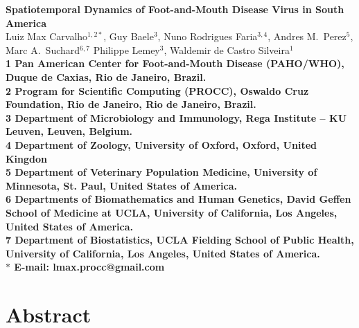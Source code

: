 \documentclass[10pt]{article}
\date{}
\begin{document}
\begin{flushleft}
{\Large
\textbf{Spatiotemporal Dynamics of Foot-and-Mouth Disease Virus in South America}
}
\\
Luiz Max Carvalho$^{1,2\ast}$,
Guy Baele$^{3}$,
Nuno Rodrigues Faria$^{3,4}$,
Andres M.~Perez$^{5}$,
Marc A.~Suchard$^{6,7}$
Philippe Lemey$^{3}$,
Waldemir de Castro Silveira$^{1}$
\\
\bf{1} Pan American Center for Foot-and-Mouth Disease (PAHO/WHO), Duque de Caxias, Rio de Janeiro, Brazil.
\\
\bf{2} Program for Scientific Computing (PROCC), Oswaldo Cruz Foundation, Rio de Janeiro, Rio de Janeiro, Brazil.
\\
\bf{3} Department of Microbiology and Immunology, Rega Institute -- KU Leuven, Leuven, Belgium.
\\
\bf{4} Department of Zoology, University of Oxford, Oxford, United Kingdon
\\
\bf{5} Department of Veterinary Population Medicine, University of Minnesota, St. Paul, United States of America.
\\
\bf{6} Departments of Biomathematics and Human Genetics, David Geffen School of Medicine at UCLA, University of California, Los Angeles,  United States of America.\\
\bf{7} Department of Biostatistics, UCLA Fielding School of Public Health, University of California, Los Angeles,  United States of America.
\\
$\ast$ E-mail: lmax.procc@gmail.com
\end{flushleft}

\section*{Abstract}
\end{document}
